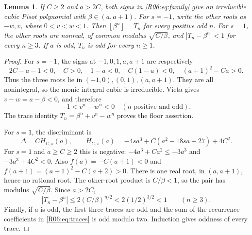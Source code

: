 \documentclass[11pt,a4paper]{article}
\newtheorem{lemma}[theorem]{Lemma}\newtheorem{proposition}[theorem]{Proposition}
\theoremstyle{definition}\newtheorem{definition}[theorem]{Definition}
\theoremstyle{remark}\newtheorem{remark}[theorem]{Remark}
\newcommand{\floor}[1]{\left\lfloor#1\right\rfloor}
\begin{document}
\begin{lemma}\label{R06:lem:roots}
If $C\ge2$ and $a>2C$, both signs in \eqref{R06:eq:family} give an
irreducible cubic Pisot polynomial with $\beta\in(a,a+1)$.
For $s=-1$, write the other roots as $-w,v$, where $0<v<w<1$.
Then $\floor{\beta^n}=T_n$ for every positive odd $n$.
For $s=1$, the other roots are nonreal, of common modulus
$\sqrt{C/\beta}$, and $|T_n-\beta^n|<1$ for every $n\ge3$.
If $a$ is odd, $T_n$ is odd for every $n\ge1$.
\end{lemma}
\begin{proof}
For $s=-1$, the signs at $-1,0,1,a,a+1$ are respectively
\[
 2C-a-1<0,\quad C>0,\quad1-a<0,\quad C(1-a)<0,
 \quad(a+1)^2-Ca>0.
\]
Thus the three roots lie in $(-1,0),(0,1),(a,a+1)$.
They are all nonintegral, so the monic integral cubic is irreducible.
Vieta gives $v-w=a-\beta<0$, and therefore
\[
 -1<v^n-w^n<0\quad(n\text{ positive and odd}).
\]
The trace identity $T_n=\beta^n+v^n-w^n$ proves the floor assertion.

For $s=1$, the discriminant is
\begin{equation}\label{R06:eq:discriminant}
 \Delta=C H_{C,s}(a),\qquad
 H_{C,s}(a)=-4sa^3+C(a^2-18sa-27)+4C^2.
\end{equation}
For $s=1$ and $a\ge C\ge2$ this is negative:
$-4a^3+Ca^2\le-3a^3$ and $-3a^3+4C^2<0$.
Also $f(a)=-C(a+1)<0$ and
$f(a+1)=(a+1)^2-C(a+2)>0$.
There is one real root, in $(a,a+1)$, hence no rational root.
The other-root product is $C/\beta<1$, so the pair has modulus
$\sqrt{C/\beta}$. Since $a>2C$,
\[
 |T_n-\beta^n|\le2(C/\beta)^{n/2}<2(1/2)^{3/2}<1
 \qquad(n\ge3).
\]
Finally, if $a$ is odd, the first three traces are odd and the sum
of the recurrence coefficients in \eqref{R06:eq:traces} is odd modulo
two. Induction gives oddness of every trace.
\end{proof}
\end{document}
